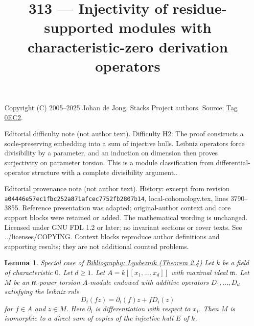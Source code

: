 \documentclass{amsart}
\newenvironment{reference}{\comment}{\endcomment}
\theoremstyle{plain}
\newtheorem{lemma}[subsection]{Lemma}
\theoremstyle{definition}
\theoremstyle{remark}
\numberwithin{equation}{subsection}
\begin{document}
\title[Stacks Project, Tag 0EC2]{313 --- Injectivity of residue-supported modules with characteristic-zero derivation operators}
\maketitle
\noindent Copyright (C) 2005--2025 Johan de Jong. Stacks Project authors. Source: \href{https://stacks.math.columbia.edu/tag/0EC2}{Tag 0EC2}.

\noindent Editorial difficulty note (not author text). Difficulty H2: The proof constructs a socle-preserving embedding into a sum of injective hulls. Leibniz operators force divisibility by a parameter, and an induction on dimension then proves surjectivity on parameter torsion. This is a module classification from differential-operator structure with a complete divisibility argument..

\noindent Editorial provenance note (not author text). History: excerpt from revision \texttt{a0444\allowbreak 6e57e\allowbreak c1fbc\allowbreak 252a8\allowbreak 71afc\allowbreak ec775\allowbreak 2fb28\allowbreak 07b14}, local-cohomology.tex, lines 3790--3855. Reference presentation was adapted; original-author context and core support blocks were retained or added. The mathematical wording is unchanged. Licensed under GNU FDL 1.2 or later; no invariant sections or cover texts. See ../licenses/COPYING. Context blocks reproduce author definitions and supporting results; they are not additional counted problems.

\begin{lemma}
\label{lemma-structure-torsion-D-module-regular}
\begin{reference}
Special case of \href{https://stacks.math.columbia.edu/bibliography}{Bibliography: Lyubeznik (Theorem 2.4)}
\end{reference}
Let $k$ be a field of characteristic $0$. Let $d \geq 1$.
Let $A = k[[x_1, \ldots, x_d]]$ with maximal ideal $\mathfrak m$.
Let $M$ be an $\mathfrak m$-power torsion $A$-module endowed with
additive operators $D_1, \ldots, D_d$ satisfying the leibniz rule
$$
D_i(fz) = \partial_i(f) z + f D_i(z)
$$
for $f \in A$ and $z \in M$. Here $\partial_i$ is
differentiation with respect to $x_i$.
Then $M$ is isomorphic to a direct sum
of copies of the injective hull $E$ of $k$.
\end{lemma}
\end{document}
